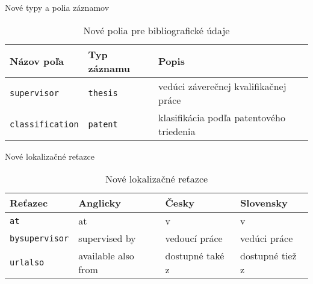 \documentclass{beamer}
\begin{document}
\begin{frame}{Nové typy a polia záznamov}
\begin{table}[!htbp]
\begin{tabularx}{\textwidth}{llX}
  \textbf{Názov poľa} & \textbf{Typ záznamu} & \textbf{Popis}\\
  \midrule
  \texttt{supervisor}     & \texttt{thesis} & vedúci záverečnej kvalifikačnej práce\\
  \texttt{classification} & \texttt{patent} & klasifikácia podľa patentového triedenia\\
  \bottomrule
\end{tabularx}
\caption{Nové polia pre bibliografické údaje}
\label{tab:newfields}
\end{table}
\end{frame}

\begin{frame}{Nové lokalizačné reťazce}
\begin{table}[!htbp]
\begin{tabularx}{\textwidth}{lXXX}
  \textbf{Reťazec} & \textbf{Anglicky} & \textbf{Česky} & \textbf{Slovensky}\\
  \midrule
  \texttt{at}           & {at} & {v} & {v}\\
  \texttt{bysupervisor} & {supervised by} & {vedouc\'{i} pr\'{a}ce} & {ved\'{u}ci pr\'{a}ce}\\
  \texttt{urlalso}      & {available also from} & {dostupn\'{e} tak\'{e} z} & {dostupn\'{e} tie\v{z} z}\\
  \bottomrule
\end{tabularx}
\caption{Nové lokalizačné reťazce}
\label{tab:newl10n}
\end{table}
\end{frame}
\end{document}
